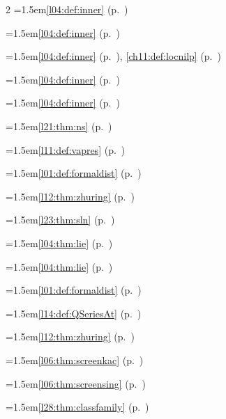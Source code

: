 \begin{multicols}{2}
\hangindent=1.5em\quad \ref{l04:def:inner} (p.~\pageref{l04:def:inner})\par
\hangindent=1.5em\quad \ref{l04:def:inner} (p.~\pageref{l04:def:inner})\par
\hangindent=1.5em\quad \ref{l04:def:inner} (p.~\pageref{l04:def:inner}), \ref{ch11:def:locnilp} (p.~\pageref{ch11:def:locnilp})\par
\hangindent=1.5em\quad \ref{l04:def:inner} (p.~\pageref{l04:def:inner})\par
\hangindent=1.5em\quad \ref{l04:def:inner} (p.~\pageref{l04:def:inner})\par
\hangindent=1.5em\quad \ref{l21:thm:ns} (p.~\pageref{l21:thm:ns})\par
\hangindent=1.5em\quad \ref{l11:def:vapres} (p.~\pageref{l11:def:vapres})\par
\hangindent=1.5em\quad \ref{l01:def:formaldist} (p.~\pageref{l01:def:formaldist})\par
\hangindent=1.5em\quad \ref{l12:thm:zhuring} (p.~\pageref{l12:thm:zhuring})\par
\hangindent=1.5em\quad \ref{l23:thm:sln} (p.~\pageref{l23:thm:sln})\par
\hangindent=1.5em\quad \ref{l04:thm:lie} (p.~\pageref{l04:thm:lie})\par
\hangindent=1.5em\quad \ref{l04:thm:lie} (p.~\pageref{l04:thm:lie})\par
\hangindent=1.5em\quad \ref{l01:def:formaldist} (p.~\pageref{l01:def:formaldist})\par
\hangindent=1.5em\quad \ref{l14:def:QSeriesAt} (p.~\pageref{l14:def:QSeriesAt})\par
\hangindent=1.5em\quad \ref{l12:thm:zhuring} (p.~\pageref{l12:thm:zhuring})\par
\hangindent=1.5em\quad \ref{l06:thm:screenkac} (p.~\pageref{l06:thm:screenkac})\par
\hangindent=1.5em\quad \ref{l06:thm:screensing} (p.~\pageref{l06:thm:screensing})\par
\hangindent=1.5em\quad \ref{l28:thm:classfamily} (p.~\pageref{l28:thm:classfamily})\par

\end{multicols}
